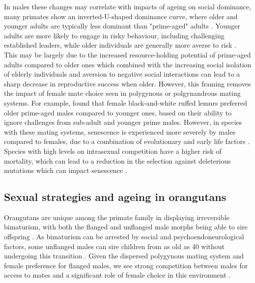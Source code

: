 In males these changes may correlate with impacts of ageing on social dominance, many primates show an inverted-U-shaped dominance curve, where older and younger adults are typically less dominant than "prime-aged" adults \citep{Packer.1979, Smuts.1989, Perlman.2016}. Younger adults are more likely to engage in risky behaviour, including challenging established leaders, while older individuals are generally more averse to risk \citep{Wilson.1985, Haux.2022}. This may be largely due to the increased resource-holding potential of prime-aged adults compared to older ones which combined with the increasing social isolation of elderly individuals and aversion to negative social interactions can lead to a sharp decrease in reproductive success when older. However, this framing removes the impact of female mate choice seen in polygynous or polgynandrous mating systems. For example, \citet{Foerg.1982} found that female black-and-white ruffed lemurs preferred older prime-aged males compared to younger ones, based on their ability to ignore challenges from sub-adult and younger prime males. However, in species with these mating systems,  senescence is experienced more severely by males compared to females, due to a combination of evolutionary and early life factors \citep{Graves.2007}. Species with high levels on intrasexual competition have a higher risk of mortality, which can lead to a reduction in the selection against deleterious mutations which can impact senescence \citep{Williams.1957}. 

\subsection{Sexual strategies and ageing in orangutans}

Orangutans are unique among the primate family in displaying irreversible bimaturism, with both the flanged and unflanged male morphs being able to sire offspring \citep{Knott.2008, Utami.2002km8}. As bimaturism can be arrested by social and psychoendoneurological factors, some unflanged males can sire children from as old as 40 without undergoing this transition \citep{Prasetyo.2021} . Given the dispersed polygynous mating system and female preference for flanged males, we see strong competition between males for access to mates and a significant role of female choice in this environment \citep{Harrison.2007ox}. 

